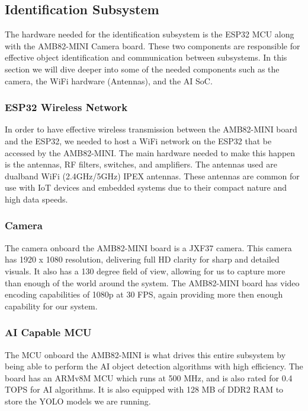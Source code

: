 \subsection{Identification Subsystem}
\noindent The hardware needed for the identification subsystem is the ESP32 MCU along with the AMB82-MINI Camera board. These two components are responsible for effective object identification and communication between subsystems. In this section we will dive deeper into some of the needed components such as the camera, the WiFi hardware (Antennas), and the AI SoC.

\subsubsection{ESP32 Wireless Network}
\noindent In order to have effective wireless transmission between the AMB82-MINI board and the ESP32, we needed to host a WiFi network on the ESP32 that be accessed by the AMB82-MINI. The main hardware needed to make this happen is the antennas, RF filters, switches, and amplifiers. The antennas used are dualband WiFi (2.4GHz/5GHz) IPEX antennas. These antennas are common for use with IoT devices and embedded systems due to their compact nature and high data speeds. 

\subsubsection{Camera}
\noindent The camera onboard the AMB82-MINI board is a JXF37 camera. This camera has 1920 x 1080 resolution, delivering full HD clarity for sharp and detailed visuals. It also has a 130 degree field of view, allowing for us to capture more than enough of the world around the system. The AMB82-MINI board has video encoding capabilities of 1080p at 30 FPS, again providing more then enough capability for our system. 

\subsubsection{AI Capable MCU}
\noindent The MCU onboard the AMB82-MINI is what drives this entire subsystem by being able to perform the AI object detection algorithms with high efficiency. The board has an ARMv8M MCU which runs at 500 MHz, and is also rated for 0.4 TOPS for AI algorithms. It is also equipped with 128 MB of DDR2 RAM to store the YOLO models we are running. 
